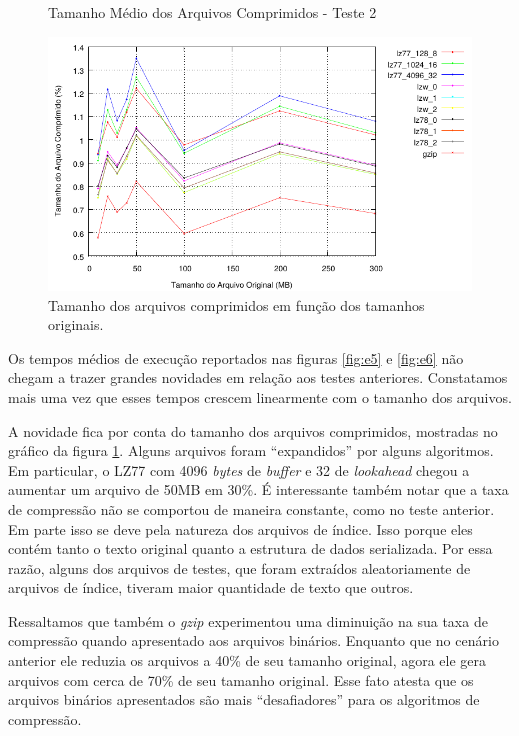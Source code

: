 \documentclass[]{article}
\newcommand{\figref}[1]{figura \ref{#1}}
\begin{document}
\begin{figure}
	{\centering Tamanho Médio dos Arquivos Comprimidos - Teste 2\par}
	\includegraphics{images/binario_taxa}
\caption{Tamanho dos arquivos comprimidos em função dos tamanhos originais.}
\label{fig:e7}
\end{figure}


Os tempos médios de execução reportados nas figuras \ref{fig:e5} e \ref{fig:e6} não chegam a trazer grandes novidades em relação aos testes anteriores. Constatamos mais uma vez que esses tempos crescem linearmente com o tamanho dos arquivos.

A novidade fica por conta do tamanho dos arquivos comprimidos, mostradas no gráfico da \figref{fig:e7}. Alguns arquivos foram ``expandidos'' por alguns algoritmos. Em particular, o LZ77 com 4096 \textit{bytes} de \textit{buffer} e 32 de \textit{lookahead} chegou a aumentar um arquivo de 50MB em 30\%. É interessante também notar que a taxa de compressão não se comportou de maneira constante, como no teste anterior. Em parte isso se deve pela natureza dos arquivos de índice. Isso porque eles contém tanto o texto original quanto a estrutura de dados serializada. Por essa razão, alguns dos arquivos de testes, que foram extraídos aleatoriamente de arquivos de índice, tiveram maior quantidade de texto que outros.

Ressaltamos que também o \textit{gzip} experimentou uma diminuição na sua taxa de compressão quando apresentado aos arquivos binários. Enquanto que no cenário anterior ele reduzia os arquivos a 40\% de seu tamanho original, agora ele gera arquivos com cerca de 70\% de seu tamanho original. Esse fato atesta que os arquivos binários apresentados são mais ``desafiadores'' para os algoritmos de compressão.
\end{document}
